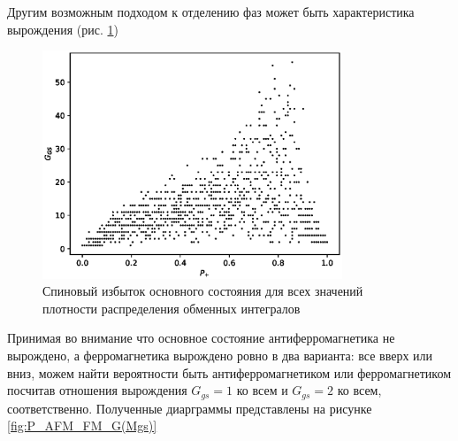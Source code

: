 \documentclass[utf8, babel, sor, jor, amsmath, amssymb, reprint]{elsarticle} %
\begin{document}
Другим возможным подходом к отделению фаз может быть характеристика вырождения (рис. \ref{fig:Ggs})

\begin{figure}[H]
	\centering
	\includegraphics[width=0.8\textwidth]{images/Ggs.eps}
	\caption{Спиновый избыток основного состояния для всех значений плотности распределения обменных интегралов}
	\label{fig:Ggs}
\end{figure}

Принимая во внимание что основное состояние антиферромагнетика не вырождено, а ферромагнетика вырождено ровно в два варианта: все вверх или вниз, можем найти вероятности быть антиферромагнетиком или ферромагнетиком посчитав отношения вырождения $G_{gs} = 1$ ко всем и $G_{gs} = 2$ ко всем, соответственно. Полученные диарграммы представлены на рисунке \ref{fig:P_AFM_FM_G(Mgs)}
\end{document}
